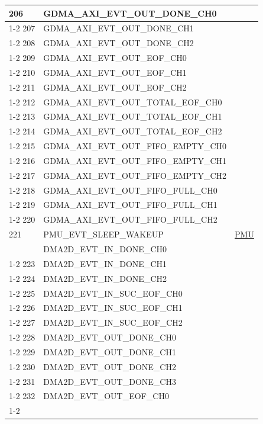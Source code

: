 \documentclass[main\_\_CN.tex]{subfiles}
\begin{document}
\begin{longtable}{ | l | l | l | }
206 & GDMA\_AXI\_EVT\_OUT\_DONE\_CH0 & \\ \cline{1-2}
207 & GDMA\_AXI\_EVT\_OUT\_DONE\_CH1 & \\ \cline{1-2}
208 & GDMA\_AXI\_EVT\_OUT\_DONE\_CH2 & \\ \cline{1-2}
209 & GDMA\_AXI\_EVT\_OUT\_EOF\_CH0  & \\ \cline{1-2}
210 & GDMA\_AXI\_EVT\_OUT\_EOF\_CH1  & \\ \cline{1-2}
211 & GDMA\_AXI\_EVT\_OUT\_EOF\_CH2  & \\ \cline{1-2}
212 & GDMA\_AXI\_EVT\_OUT\_TOTAL\_EOF\_CH0  & \\ \cline{1-2}
213 & GDMA\_AXI\_EVT\_OUT\_TOTAL\_EOF\_CH1  & \\ \cline{1-2}
214 & GDMA\_AXI\_EVT\_OUT\_TOTAL\_EOF\_CH2  & \\ \cline{1-2}
215 & GDMA\_AXI\_EVT\_OUT\_FIFO\_EMPTY\_CH0 & \\ \cline{1-2}
216 & GDMA\_AXI\_EVT\_OUT\_FIFO\_EMPTY\_CH1 & \\ \cline{1-2}
217 & GDMA\_AXI\_EVT\_OUT\_FIFO\_EMPTY\_CH2 & \\ \cline{1-2}
218 & GDMA\_AXI\_EVT\_OUT\_FIFO\_FULL\_CH0  & \\ \cline{1-2}
219 & GDMA\_AXI\_EVT\_OUT\_FIFO\_FULL\_CH1  & \\ \cline{1-2}
220 & GDMA\_AXI\_EVT\_OUT\_FIFO\_FULL\_CH2  & \\ \hline
221 & PMU\_EVT\_SLEEP\_WAKEUP   & \hyperref[mod:lowpowm]{PMU} \\ \hline
\iftagged{ESP32-P4-latest}{%
222 & DMA2D\_EVT\_IN\_DONE\_CH0  & \nameref{mod:2ddma} \\ \cline{1-2}
223 & DMA2D\_EVT\_IN\_DONE\_CH1  & \\ \cline{1-2}
224 & DMA2D\_EVT\_IN\_DONE\_CH2  & \\ \cline{1-2}
225 & DMA2D\_EVT\_IN\_SUC\_EOF\_CH0  & \\ \cline{1-2}
226 & DMA2D\_EVT\_IN\_SUC\_EOF\_CH1  & \\ \cline{1-2}
227 & DMA2D\_EVT\_IN\_SUC\_EOF\_CH2  & \\ \cline{1-2}
228 & DMA2D\_EVT\_OUT\_DONE\_CH0  & \\ \cline{1-2}
229 & DMA2D\_EVT\_OUT\_DONE\_CH1  & \\ \cline{1-2}
230 & DMA2D\_EVT\_OUT\_DONE\_CH2  & \\ \cline{1-2}
231 & DMA2D\_EVT\_OUT\_DONE\_CH3  & \\ \cline{1-2}
232 & DMA2D\_EVT\_OUT\_EOF\_CH0  & \\ \cline{1-2}
}
\end{longtable}
\end{document}
